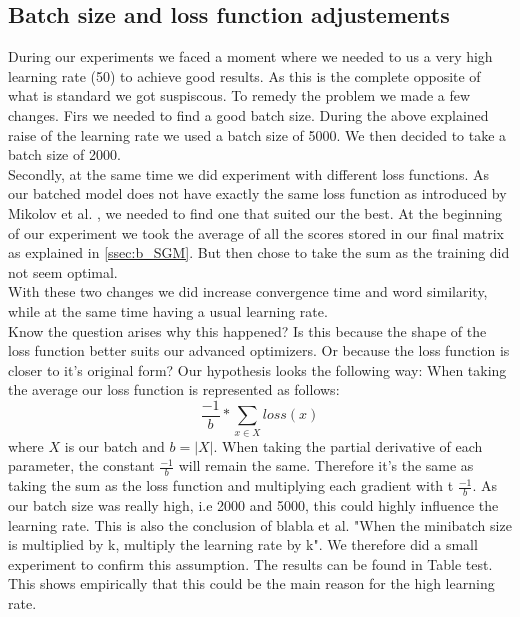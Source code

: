 \subsection{Batch size and loss function adjustements}\label{ssec:bs_lf}
During our experiments we faced a moment where we needed to us a very high learning rate (50) to achieve good results. As this is the complete opposite of what is standard we got suspiscous. To remedy the problem we made a few changes. 
Firs we needed to find a good batch size. During the above explained raise of the learning rate we used a batch size of 5000. We then decided to take a batch size of 2000.\\
 Secondly, at the same time we did experiment with different loss functions. As our batched model does not have exactly the same loss function as introduced by Mikolov et al. \cite{mikolov}, we needed to find one that suited  our the best. At the beginning of our experiment we took the average of all the scores stored in our final matrix as explained in \ref{ssec:b_SGM}. But then chose to take the sum as the training did not seem optimal.\\ 
 With these two changes we did increase convergence time and word similarity, while at the same time having a usual learning rate. \\
 Know the question arises why this happened? Is this because the shape of the loss function better suits our advanced optimizers. Or because the loss function is closer to it's original form? Our hypothesis looks the following way: 
 When taking the average our loss function is represented as follows:
 \begin{equation}
 \frac{-1}{b }* \sum_{x\in X} loss(x)
 \end{equation}
where $X$ is our batch and $b = |X|$. 
When taking the partial derivative of each parameter, the constant $ \frac{-1}{b }$ will remain the same. Therefore it's the same as taking the sum as the loss function and multiplying each gradient with t $ \frac{-1}{b }$. As our batch size was really high, i.e 2000 and 5000, this could highly influence the learning rate. This is also the conclusion of blabla et al. \cite{fb} "When the minibatch size is multiplied by k, multiply the learning rate by k". We therefore did a small experiment to confirm this assumption. The results can be found in Table test. This shows empirically that this could be the main reason for the high learning rate.

